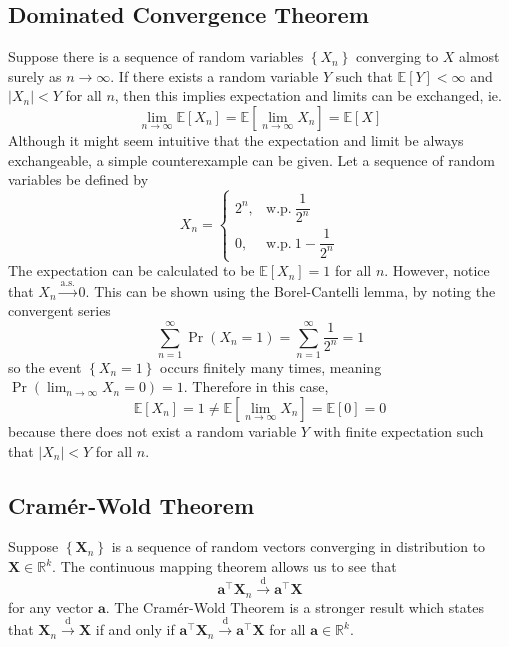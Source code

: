 \documentclass[11pt]{report} %
\begin{document}
\subsection{Dominated Convergence Theorem}

Suppose there is a sequence of random variables $\left\{X_{n}\right\}$ converging to $X$ almost surely as $n\to\infty$. If there exists a random variable $Y$ such that $\mathbb{E}\left[Y\right] < \infty$ and $\left|X_{n}\right| < Y$ for all $n$, then this implies expectation and limits can be exchanged, ie.
\begin{equation}
\lim_{n\to\infty}\mathbb{E}\left[X_{n}\right] = \mathbb{E}\left[\lim_{n\to\infty}X_{n}\right] = \mathbb{E}\left[X\right]
\end{equation}
Although it might seem intuitive that the expectation and limit be always exchangeable, a simple counterexample can be given. Let a sequence of random variables be defined by
\begin{equation}
X_{n} = \begin{cases} 2^{n}, & \mathrm{w.p.}\ \dfrac{1}{2^{n}} \\ 0, & \mathrm{w.p.}\ 1 - \dfrac{1}{2^{n}}\end{cases}
\end{equation}
The expectation can be calculated to be $\mathbb{E}\left[X_{n}\right] = 1$ for all $n$. However, notice that $X_{n} \overset{\mathrm{a.s.}}{\to} 0$. This can be shown using the Borel-Cantelli lemma, by noting the convergent series
\begin{equation}
\sum_{n = 1}^{\infty}\operatorname{Pr}\left(X_{n} = 1\right) = \sum_{n = 1}^{\infty}\dfrac{1}{2^{n}} = 1
\end{equation}
so the event $\left\{X_{n} = 1\right\}$ occurs finitely many times, meaning $\operatorname{Pr}\left(\lim_{n\to\infty}X_{n} = 0\right) = 1$. Therefore in this case,
\begin{equation}
\mathbb{E}\left[X_{n}\right] = 1 \neq \mathbb{E}\left[\lim_{n\to\infty}X_{n}\right] = \mathbb{E}\left[0\right] = 0
\end{equation}
because there does not exist a random variable $Y$ with finite expectation such that $\left|X_{n}\right| < Y$ for all $n$.

\subsection{Cram\'{e}r-Wold Theorem \cite{Billingsley1995}}

Suppose $\left\{\mathbf{X}_{n}\right\}$ is a sequence of random vectors converging in distribution to $\mathbf{X} \in \mathbb{R}^{k}$. The continuous mapping theorem allows us to see that
\begin{equation}
\mathbf{a}^{\top}\mathbf{X}_{n} \overset{\mathrm{d}}{\to} \mathbf{a}^{\top}\mathbf{X}
\end{equation}
for any vector $\mathbf{a}$. The Cram\'{e}r-Wold Theorem is a stronger result which states that $\mathbf{X}_{n} \overset{\mathrm{d}}{\to} \mathbf{X}$ if and only if $\mathbf{a}^{\top}\mathbf{X}_{n} \overset{\mathrm{d}}{\to} \mathbf{a}^{\top}\mathbf{X}$ for all $\mathbf{a} \in \mathbb{R}^{k}$.
\end{document}

